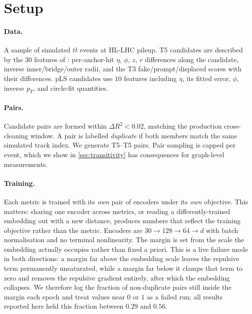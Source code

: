 \documentclass[11pt]{article}
\newcommand{\dRsq}{\Delta R^2}
\begin{document}
\section{Setup}
\label{sec:setup}

\paragraph{Data.} A sample of \Nevents{} simulated $t\bar{t}$ events at
HL-LHC pileup. T5 candidates are described by the $30$ features of
\cite{dp2025048}: per-anchor-hit $\eta$, $\phi$, $z$, $r$ differences along the
candidate, inverse inner/bridge/outer radii, and the T3 fake/prompt/displaced
scores with their differences. pLS candidates use $10$ features including
$\eta$, its fitted error, $\phi$, inverse $p_T$, and circle-fit quantities.

\paragraph{Pairs.} Candidate pairs are formed within $\dRsq<0.02$, matching the
production cross-cleaning window. A pair is labelled \emph{duplicate} if both
members match the same simulated track index. We generate \NpairsTfive{} T5--T5
pairs. Pair sampling is capped per event, which we show
in \cref{sec:transitivity} has consequences for graph-level measurements.

\paragraph{Training.} Each metric is trained with its \emph{own} pair of encoders
under its \emph{own} objective. This matters: sharing one encoder across metrics,
or reading a differently-trained embedding out with a new distance, produces
numbers that reflect the training objective rather than the metric. Encoders are
$30{\to}128{\to}64{\to}d$ with batch normalisation and no terminal nonlinearity.
The margin is set from the scale the embedding actually occupies rather than
fixed a priori. This is a live failure mode in both directions: a margin far
above the embedding scale leaves the repulsive term permanently unsaturated,
while a margin far below it clamps that term to zero and removes the repulsive
gradient entirely, after which the embedding collapses. We therefore log the
fraction of non-duplicate pairs still inside the margin each epoch and treat
values near $0$ or $1$ as a failed run; all results reported here held this
fraction between $0.29$ and $0.56$.
\end{document}
